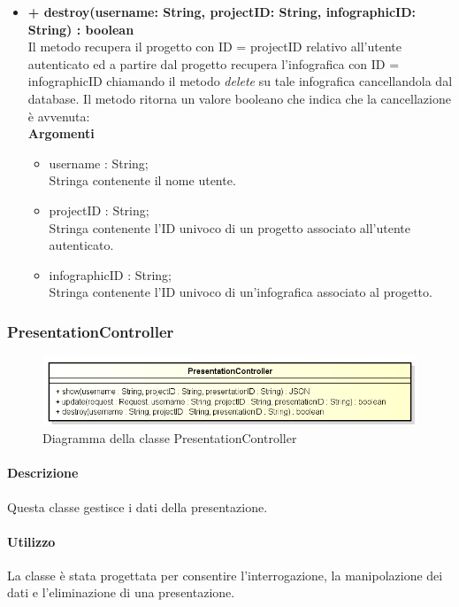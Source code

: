 \begin{itemize}
			\item \textbf{+ destroy(username: String, projectID: String, infographicID: String) : boolean}\\
			Il metodo recupera il progetto con ID = projectID relativo all'utente autenticato ed a partire dal progetto recupera l'\gls{infografica} con ID = infographicID chiamando il metodo \textit{delete} su tale \gls{infografica} cancellandola dal \gls{database}. Il metodo ritorna un valore booleano che indica che la cancellazione è avvenuta:\\
			\textbf{Argomenti}
			\begin{itemize}
				\item username : String; \\
				Stringa contenente il nome utente.
				\item projectID : String; \\
				Stringa contenente l'ID univoco di un progetto associato all'utente autenticato.
				\item infographicID : String; \\
				Stringa contenente l'ID univoco di un'\gls{infografica} associato al progetto.
			\end{itemize}
		\end{itemize}
		
\newpage
\subsubsection{PresentationController}
\begin{figure}[h]
\centering
\includegraphics[width=0.8\linewidth]{img/back_end_http_controllers_presentationController}
\caption[Diagramma della classe PresentationController]{Diagramma della classe PresentationController}
\end{figure}


	\paragraph{Descrizione}
		Questa classe gestisce i dati della presentazione.
	\paragraph{Utilizzo}
		La classe è stata progettata per consentire l'interrogazione, la manipolazione dei dati e l'eliminazione di una presentazione.
	

